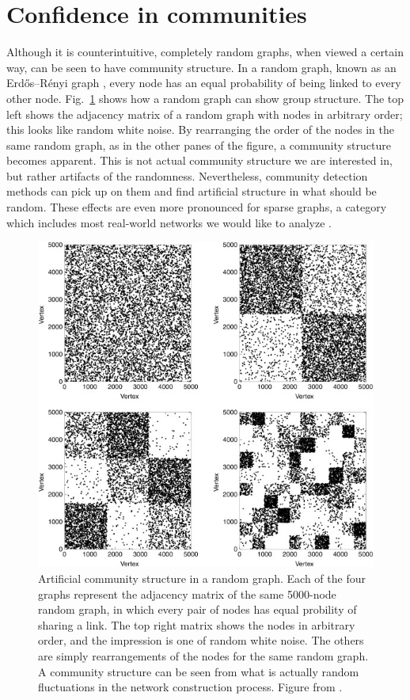 \section{Confidence in communities}\label{confidence-in-communities}

Although it is counterintuitive, completely random graphs, when viewed a
certain way, can be seen to have community structure. In a random graph,
known as an Erdős--Rényi graph \autocite{erdos_evolution_1960}, every
node has an equal probability of being linked to every other node.
Fig.~\ref{fig:randomcommunities} shows how a random graph can show group
structure. The top left shows the adjacency matrix of a random graph
with nodes in arbitrary order; this looks like random white noise. By
rearranging the order of the nodes in the same random graph, as in the
other panes of the figure, a community structure becomes apparent. This
is not actual community structure we are interested in, but rather
artifacts of the randomness. Nevertheless, community detection methods
can pick up on them and find artificial structure in what should be
random. These effects are even more pronounced for sparse graphs, a
category which includes most real-world networks we would like to
analyze \autocite{fortunato_community_2016}.

\begin{figure}
\centering
\includegraphics{img/fortunato2016_fig29_randomcommunities.jpg}
\caption{Artificial community structure in a random graph. Each of the
four graphs represent the adjacency matrix of the same 5000-node random
graph, in which every pair of nodes has equal probility of sharing a
link. The top right matrix shows the nodes in arbitrary order, and the
impression is one of random white noise. The others are simply
rearrangements of the nodes for the same random graph. A community
structure can be seen from what is actually random fluctuations in the
network construction process. Figure from
\autocite{fortunato_community_2016}.}\label{fig:randomcommunities}
\end{figure}

